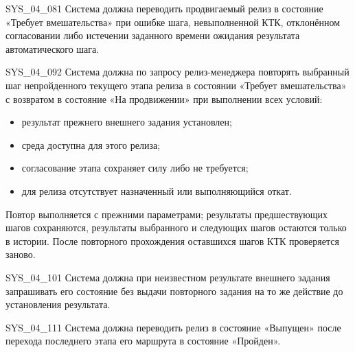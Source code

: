 \documentclass{tpks}
\begin{document}
\begin{req}{SYS_04_08}{1}
Система должна переводить продвигаемый релиз в состояние «Требует вмешательства» при ошибке шага, невыполненной КТК, отклонённом согласовании либо истечении заданного времени ожидания результата автоматического шага.
\end{req}

\begin{req}{SYS_04_09}{2}
Система должна по запросу релиз-менеджера повторять выбранный шаг непройденного
текущего этапа релиза в состоянии «Требует вмешательства» с возвратом в состояние
«На продвижении» при выполнении всех условий:
\begin{itemize}
\item результат прежнего внешнего задания установлен;
\item среда доступна для этого релиза;
\item согласование этапа сохраняет силу либо не требуется;
\item для релиза отсутствует назначенный или выполняющийся откат.
\end{itemize}
Повтор выполняется с прежними параметрами; результаты предшествующих шагов сохраняются,
результаты выбранного и следующих шагов остаются только в истории. После повторного
прохождения оставшихся шагов КТК проверяется заново.
\end{req}

\begin{req}{SYS_04_10}{1}
Система должна при неизвестном результате внешнего задания запрашивать его состояние без выдачи повторного задания на то же действие до установления результата.
\end{req}

\begin{req}{SYS_04_11}{1}
Система должна переводить релиз в состояние «Выпущен» после перехода последнего этапа его маршрута в состояние «Пройден».
\end{req}
\end{document}
